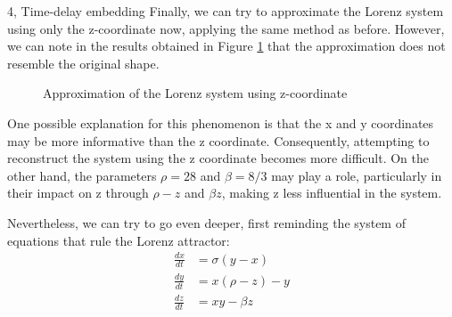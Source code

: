 \begin{task}{4, Time-delay embedding}
Finally, we can try to approximate the Lorenz system using only the z-coordinate now, applying the same method as before. However, we can note in the results obtained in Figure \ref{lorenzz} that the approximation does not resemble the original shape.
\begin{figure}[H]
\centering
{}
\caption{Approximation of the Lorenz system using z-coordinate}
\label{lorenzz}
\end{figure}

One possible explanation for this phenomenon is that the x and y coordinates may be more informative than the z coordinate. Consequently, attempting to reconstruct the system using the z coordinate becomes more difficult. On the other hand, the parameters \(\rho = 28\) and \(\beta = 8/3\) may play a role, particularly in their impact on z through \(\rho - z\) and \(\beta z\), making z less influential in the system.

Nevertheless, we can try to go even deeper, first reminding the system of equations that rule the Lorenz attractor:
\begin{align*}
\frac{dx}{dt} &= \sigma (y - x) \\
\frac{dy}{dt} &= x (\rho - z) - y \\
\frac{dz}{dt} &= xy - \beta z
\end{align*}


\end{task}
